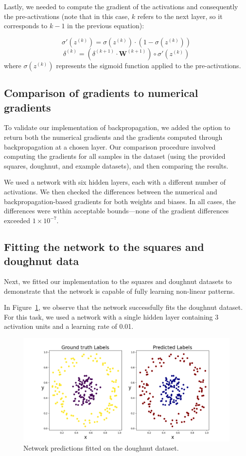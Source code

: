 \documentclass[9pt]{IEEEtran}
\begin{document}
Lastly, we needed to compute the gradient of the activations and consequently the pre-activations 
(note that in this case, \(k\) refers to the next layer, so it corresponds to \(k-1\) in the
 previous equation):

\[
\sigma'(z^{(k)}) = \sigma(z^{(k)}) \cdot \left(1 - \sigma(z^{(k)})\right)
\]
\[
\delta^{(k)} = \left( \delta^{(k+1)} \cdot \mathbf{W}^{(k+1)} \right) \circ \sigma'(z^{(k)})
\]
where \( \sigma(z^{(k)}) \) represents the sigmoid function applied to the pre-activations.

\subsection{Comparison of gradients to numerical gradients}
To validate our implementation of backpropagation, we added the option to return both 
the numerical gradients and the gradients computed through backpropagation at a chosen
 layer. Our comparison procedure involved computing the gradients for all samples in the 
 dataset (using the provided squares, doughnut, and example datasets), and then comparing 
 the results.

We used a network with six hidden layers, each with a different number of 
activations. We then checked the differences between the
 numerical and backpropagation-based gradients for both weights
  and biases. In all cases, the differences were within acceptable
   bounds—none of the gradient differences exceeded \(1 \times 10^{-7}\).

\subsection{Fitting the network to the squares and doughnut data}
Next, we fitted our implementation to the squares and doughnut datasets to 
demonstrate that the network is capable of fully learning non-linear patterns.

In Figure~\ref{fig:doughnut}, we observe that the network successfully fits the doughnut dataset. 
For this task, we used a network with a single hidden layer
 containing 3 activation units and a learning rate of 0.01.

\begin{figure}[h]
    \centering
    \includegraphics[width=1\columnwidth]{figures/doughnut.png}
    \caption{Network predictions fitted on the doughnut dataset.}
    \label{fig:doughnut}
\end{figure}
\end{document}
